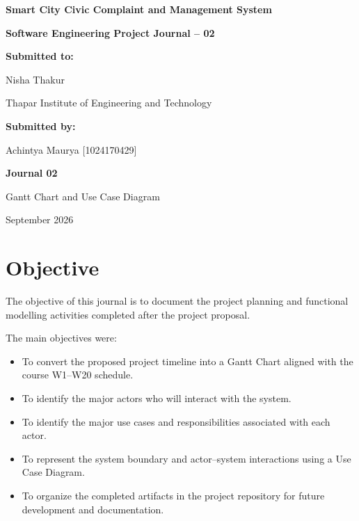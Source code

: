 \documentclass[12pt,a4paper]{article}
\begin{document}
\begin{titlepage}
\centering
\vspace*{0.8in}

{\Large\bfseries Smart City Civic Complaint and Management System\par}
\vspace{0.25in}
{\large\bfseries Software Engineering Project Journal -- 02\par}

\vspace{0.8in}

\textbf{Submitted to:}\par
Nisha Thakur\par
Thapar Institute of Engineering and Technology\par

\vspace{0.45in}

\textbf{Submitted by:}\par
Achintya Maurya [1024170429]\par


\vfill

\textbf{Journal 02}\par
Gantt Chart and Use Case Diagram\par
September 2026

\end{titlepage}

\section{Objective}

The objective of this journal is to document the project planning and functional modelling activities completed after the project proposal.

The main objectives were:

\begin{itemize}[leftmargin=*]
\item To convert the proposed project timeline into a Gantt Chart aligned with the course W1--W20 schedule.
\item To identify the major actors who will interact with the system.
\item To identify the major use cases and responsibilities associated with each actor.
\item To represent the system boundary and actor--system interactions using a Use Case Diagram.
\item To organize the completed artifacts in the project repository for future development and documentation.
\end{itemize}
\end{document}
